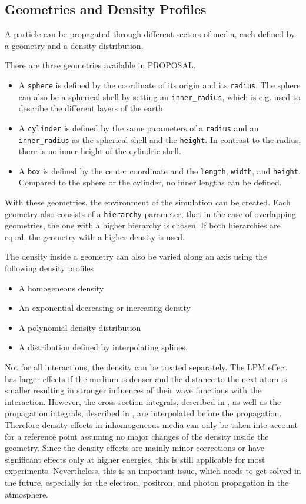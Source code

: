 %

\subsection{Geometries and Density Profiles} \label{sec:geometry_density}

A particle can be propagated through different sectors of media, each defined by a geometry and a density distribution.

There are three geometries available in PROPOSAL.
\begin{itemize}
    \item A \texttt{sphere} is defined by the coordinate of its origin and its \texttt{radius}. The sphere can also be a spherical shell by setting an \texttt{inner\_radius}, which is e.g. used to describe the different layers of the earth.
    \item A \texttt{cylinder} is defined by the same parameters of a \texttt{radius} and an \texttt{inner\_radius} as the spherical shell and the \texttt{height}. In contrast to the radius, there is no inner height of the cylindric shell.
    \item A \texttt{box} is defined by the center coordinate and the \texttt{length}, \texttt{width}, and \texttt{height}. Compared to the sphere or the cylinder, no inner lengths can be defined.
\end{itemize}
With these geometries, the environment of the simulation can be created.
Each geometry also consists of a \texttt{hierarchy} parameter, that in the case of overlapping geometries, the one with a higher hierarchy is chosen.
If both hierarchies are equal, the geometry with a higher density is used.

The density inside a geometry can also be varied along an axis using the following density profiles
\begin{itemize}
    \item A homogeneous density
    \item An exponential decreasing or increasing density
    \item A polynomial density distribution
    \item A distribution defined by interpolating splines.
\end{itemize}
Not for all interactions, the density can be treated separately.
The LPM effect has larger effects if the medium is denser and the distance to the next atom is smaller resulting in stronger influences of their wave functions with the interaction.
However, the cross-section integrals, described in , as well as the propagation integrals, described in , are interpolated before the propagation.
Therefore density effects in inhomogeneous media can only be taken into account for a reference point assuming no major changes of the density inside the geometry.
Since the density effects are mainly minor corrections or have significant effects only at higher energies, this is still applicable for most experiments.
Nevertheless, this is an important issue, which needs to get solved in the future, especially for the electron, positron, and photon propagation in the atmosphere.

